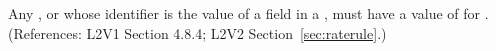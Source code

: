 Any \Compartment, \Species or \Parameter whose identifier is the value of a
 field in a \RateRule, must have a value of 
for .  (References: L2V1 Section 4.8.4; L2V2
Section~\ref{sec:raterule}.)
